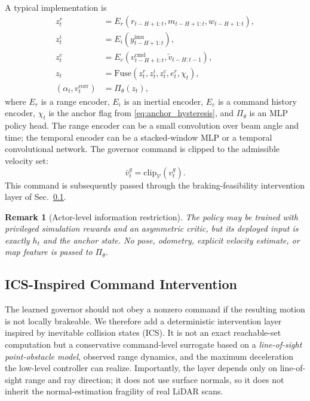 \documentclass[11pt]{article}
\newtheorem{remark}{Remark}
\begin{document}
A typical implementation is
\begin{align}
    z^r_t &= E_r(r_{t-H+1:t}, m_{t-H+1:t}, w_{t-H+1:t}), \\
    z^i_t &= E_i(y^{\mathrm{imu}}_{t-H+1:t}), \\
    z^c_t &= E_c(v^{\mathrm{cmd}}_{t-H+1:t}, \tilde v_{t-H:t-1}), \\
    z_t   &= \mathrm{Fuse}(z^r_t,z^i_t,z^c_t,e^r_t,\chi_t), \\
    (\alpha_t,v^{\mathrm{corr}}_t) &= \Pi_\theta(z_t),
    \label{eq:network_architecture}
\end{align}
where $E_r$ is a range encoder, $E_i$ is an inertial encoder, $E_c$ is a command
history encoder, $\chi_t$ is the anchor flag from \eqref{eq:anchor_hysteresis},
and $\Pi_\theta$ is an MLP policy head. The range encoder can be a small
convolution over beam angle and time; the temporal encoder can be a
stacked-window MLP or a temporal convolutional network. The governor command is
clipped to the admissible velocity set:
\begin{equation}
    \bar v^g_t = \mathrm{clip}_{\mathcal{V}}(v^{g}_t).
    \label{eq:clip_governor}
\end{equation}
This command is subsequently passed through the braking-feasibility intervention
layer of Sec.~\ref{sec:safety}.

\begin{remark}[Actor-level information restriction]
The policy may be trained with privileged simulation rewards and an asymmetric
critic, but its deployed input is exactly $h_t$ and the anchor state. No pose,
odometry, explicit velocity estimate, or map feature is passed to $\Pi_\theta$.
\end{remark}

\subsection{ICS-Inspired Command Intervention}
\label{sec:safety}

The learned governor should not obey a nonzero command if the resulting motion
is not locally brakeable. We therefore add a deterministic intervention layer
inspired by inevitable collision states (ICS). It is not an exact reachable-set
computation but a conservative command-level surrogate based on a
\emph{line-of-sight point-obstacle model}, observed range dynamics, and the
maximum deceleration the low-level controller can realize. Importantly, the
layer depends only on line-of-sight range and ray direction; it does not use
surface normals, so it does not inherit the normal-estimation fragility of real
LiDAR scans.
\end{document}
